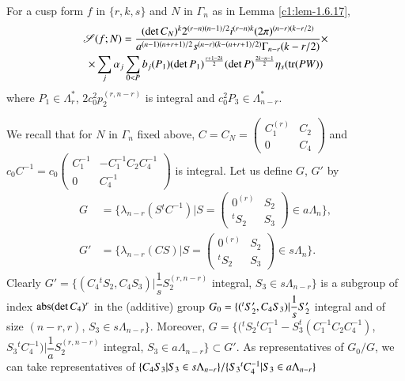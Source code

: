 \begin{sublemma}\label{c1:lem-1.6.20}
For a cusp form $f$ in $\{r,k,s\}$ and $N$ in $\Gamma_{n}$ as in Lemma
\ref{c1:lem-1.6.17}, 
\begin{gather*}
\mathscr{S}(f;N)=\frac{(\det
  C_{N})^{k}2^{(r-n)(n-1)/2}i^{(r-n)k}(2\pi)^{(n-r)(k-r/2)}}{a^{(n-1)(n+r+1)/2}s^{(n-r)(k-(n+r+1)/2)}\Gamma_{n-r}(k-r/2)}\times\\
\times\sum_{j}\alpha_{j}\sum_{0<P}b_{j}(P_{1})(\det
P_{1})^{\frac{r+1-2k}{2}}(\det P)^{\frac{2k-n-1}{2}}\eta_{s}(\operatorname{tr}(PW))
\end{gather*}
where $P_{1}\in\Lambda^{\ast}_{r}$, $2c^{2}_{0}p^{(r,n-r)}_{2}$ is
integral and $c^{2}_{0}P_{3}\in\Lambda^{\ast}_{n-r}$.
\end{sublemma}

We recall that for $N$ in $\Gamma_{n}$ fixed above, $C=C_{N}=\left(
\begin{smallmatrix} C^{(r)}_{1} & C_{2}\\ 0 & C_{4}
\end{smallmatrix}\right)$ and
$c_{0}C^{-1}=c_{0}\left(\begin{smallmatrix} C^{-1}_{1} &
  -C^{-1}_{1}C_{2}C^{-1}_{4}\\ 0 & C^{-1}_{4}\end{smallmatrix}\right)$
is integral. Let us define $G$, $G'$ by 
\begin{align*}
G &= \{\lambda_{n-r}(S{}^{t}C^{-1})|S=
\begin{pmatrix}
0^{(r)} & S_{2}\\
{}^{t}S_{2} & S_{3}
\end{pmatrix}
\in a\Lambda_{n}\},\\
G' &= \{\lambda_{n-r}(CS)|S=
\begin{pmatrix}
0^{(r)} & S_{2}\\
{}^{t}S_{2} & S_{3}
\end{pmatrix}
\in s\Lambda_{n}\}.
\end{align*}
Clearly $G'=\{(C_{4}{}^{t}S_{2},
C_{4}S_{3})|\dfrac{1}{s}S_{2}^{(r,n-r)}$ integral, $S_{3}\in
s\Lambda_{n-r}\}$ is a subgroup of index $\operatorname{abs}(\det C_{4})^{r}$ in the
(additive) group $G_{0}=\{({}^{t}S'_{2},
C_{4}S_{3})|\dfrac{1}{s}\break S'_{2}$ integral and of size $(n-r,r)$,
$S_{3}\in s\Lambda_{n-r}\}$. Moreover,
$G=\{({}^{t}S_{2}{}^{t}C^{-1}_{1}-S^{t}_{3}(C^{-1}_{1}C_{2}C^{-1}_{4})$,
$S_{3}{}^{t}C^{-1}_{4})|\dfrac{1}{a}S_{2}^{(r,n-r)}$ integral,
$S_{3}\in a\Lambda_{n-r}\}\subset G'$. As representatives of $G_{0}/G$, we
can take representatives of $\{C_{4}S_{3}|S_{3}\in
s\Lambda_{n-r}\}/\break\{S_{3}{}^{t}C^{-1}_{4}|S_{3}\in a\Lambda_{n-r}\}$
